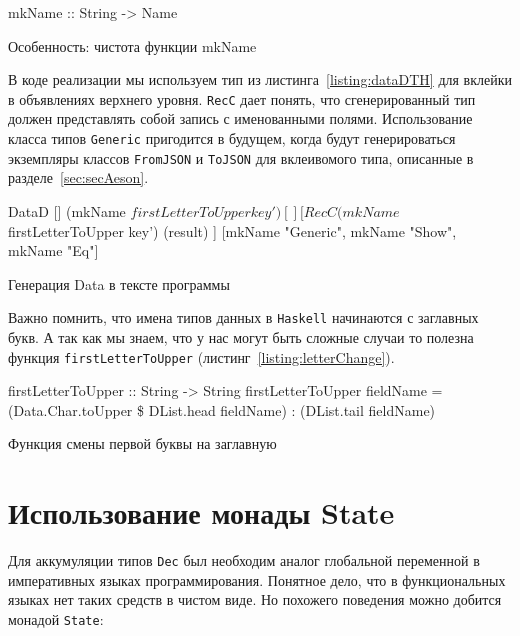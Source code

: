 \begin{ListingEnv}[H]
\begin{Verb}
mkName :: String -> Name
\end{Verb}
\caption{Особенность: чистота функции mkName}
\label{listing:mkName}
\end{ListingEnv} 

В коде реализации мы используем тип из листинга~\ref{listing:dataDTH} для вклейки в объявлениях верхнего уровня. \lstinline{RecC} дает понять, что сгенерированный тип должен представлять собой запись с именованными полями. Использование класса типов \lstinline{Generic} пригодится в будущем, когда будут генерироваться экземпляры классов \lstinline{FromJSON} и \lstinline{ToJSON} для вклеивомого типа, описанные в разделе~\ref{sec:secAeson}.

\begin{ListingEnv}[H]
\begin{Verb}
DataD
     []
     (mkName $ firstLetterToUpper key')
     []
     [ RecC (mkName $ firstLetterToUpper key')  (result) ]
     [mkName "Generic", mkName "Show", mkName "Eq"]
\end{Verb}
\caption{Генерация Data в тексте программы}
\label{listing:dataDTHjson}
\end{ListingEnv} 

Важно помнить, что имена типов данных в \lstinline{Haskell} начинаются с заглавных букв. А так как мы знаем, что у нас могут быть сложные случаи то полезна функция \lstinline{firstLetterToUpper} (листинг~\ref{listing:letterChange}).

\begin{ListingEnv}[H]
\begin{Verb}
firstLetterToUpper :: String -> String
firstLetterToUpper fieldName = (Data.Char.toUpper 
                                         \$ DList.head fieldName)
                                         : (DList.tail fieldName)
\end{Verb}
\caption{Функция смены первой буквы на заглавную}
\label{listing:letterChange}
\end{ListingEnv} 

\section{Использование монады State}

Для аккумуляции типов \lstinline{Dec} был необходим аналог глобальной переменной в императивных языках программирования. Понятное дело, что в функциональных языках нет таких средств в чистом виде. Но похожего поведения можно добится монадой \lstinline{State}:

